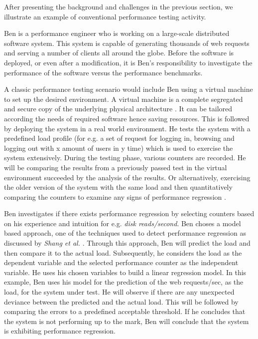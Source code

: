 After presenting the background and challenges in the previous section, we illustrate an example of conventional performance testing activity.

Ben is a performance engineer who is working on a large-scale distributed software system. This system is capable of generating thousands of web requests and serving a number of clients all around the globe. Before the software is deployed, or even after a modification, it is Ben's responsibility to investigate the performance of the software versus the performance benchmarks.

A classic performance testing scenario would include Ben using a virtual machine to set up the desired environment. A virtual machine is a complete segregated and secure copy of the underlying physical architecture \cite{sugerman2001virtualizing}. It can be tailored according the needs of required software hence saving resources. This is followed by deploying the system in a real world environment. He tests the system with a predefined load profile (for e.g. a set of request for logging in, browsing and logging out with x amount of users in y time) which is used to exercise the system extensively. During the testing phase, various counters are recorded. He will be comparing the results from a previously passed test in the virtual environment succeeded by the analysis of the results. \cite{5306331} Or alternatively, exercising the older version of the system with the same load and then quantitatively comparing the counters to examine any signs of performance regression \cite{sugerman2001virtualizing}.

Ben investigates if there exists performance regression by selecting counters based on his experience and intuition for e.g. \textit{disk reads/second}. Ben choses a model based approach, one of the techniques used to detect performance regression as discussed by \textit{Shang et al.} \cite{Shang:2015:ADP:2668930.2688052}. Through this approach, Ben will predict the load and then compare it to the actual load. Subsequently, he considers the load as the dependent variable and the selected performance counter as the independent variable. He uses his chosen variables to build a linear regression model. In this example, Ben uses his model for the prediction of the web requests/sec, as the load, for the system under test. He will observe if there are any unexpected deviance between the predicted and the actual load. This will be followed by comparing the errors to a predefined acceptable threshold. If he concludes that the system is not performing up to the mark, Ben will conclude that the system is exhibiting performance regression. 

